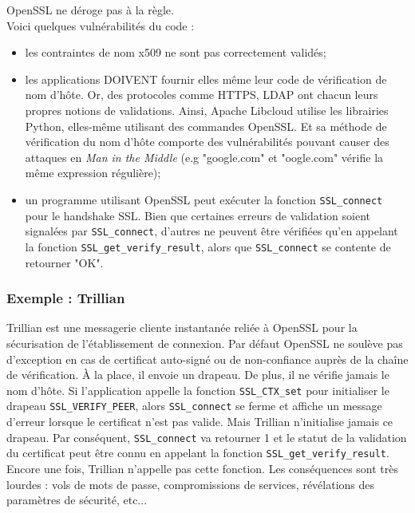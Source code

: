 OpenSSL ne déroge pas à la règle.\\
Voici quelques vulnérabilités du code :
\begin{itemize}
\item les contraintes de nom x509 ne sont pas correctement validés;
\item les applications DOIVENT fournir elles même leur code de vérification de nom d'hôte. Or, des protocoles comme HTTPS, LDAP ont chacun leurs propres notions de validations. Ainsi, Apache Libcloud utilise les librairies Python, elles-même utilisant des commandes OpenSSL. Et sa méthode de vérification du nom d'hôte comporte des vulnérabilités pouvant causer des attaques en \textit{Man in the Middle} (e.g "google.com" et "oogle.com" vérifie la même expression régulière);
\item un programme utilisant OpenSSL peut exécuter la fonction \texttt{SSL\_connect} pour le handshake SSL. Bien que certaines erreurs de validation soient signalées par \texttt{SSL\_connect}, d'autres ne peuvent être vérifiées qu'en appelant la fonction \texttt{SSL\_get\_verify\_result}, alors que \texttt{SSL\_connect} se contente de retourner "OK".\\
\end{itemize}

\subsubsection{Exemple : Trillian}

Trillian est une messagerie cliente instantanée reliée à OpenSSL pour la sécurisation de l'établissement de connexion. Par défaut OpenSSL ne soulève pas d'exception en cas de certificat auto-signé ou de non-confiance auprès de la chaîne de vérification. À la place, il envoie un drapeau. De plus, il ne vérifie jamais le nom d'hôte. Si l'application appelle la fonction \texttt{SSL\_CTX\_set} pour initialiser le drapeau \texttt{SSL\_VERIFY\_PEER}, alors \texttt{SSL\_connect} se ferme et affiche un message d'erreur lorsque le certificat n'est pas valide. Mais Trillian n'initialise jamais ce drapeau. Par conséquent, \texttt{SSL\_connect} va retourner 1 et le statut de la validation du certificat peut être connu en appelant la fonction \texttt{SSL\_get\_verify\_result}. Encore une fois, Trillian n'appelle pas cette fonction. Les conséquences sont très lourdes : vols de mots de passe, compromissions de services, révélations des paramètres de sécurité, etc...\\


